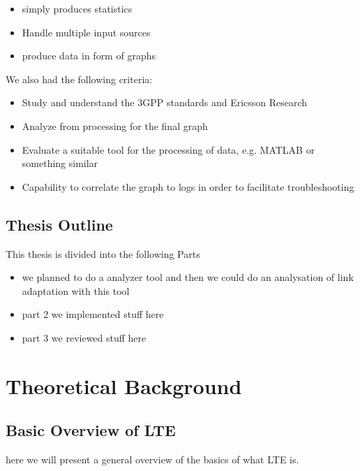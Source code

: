 \documentclass[cropmarks, frame, english]{idamasterthesis}
\begin{document}
 \begin{itemize} 
 \item simply produces statistics
 \item Handle multiple input sources
 \item produce data in form of graphs
 \end{itemize} 

\setlength{\parindent}{0cm} We also had the following criteria: 
 
 \begin{itemize} 
 \item Study and understand the 3GPP standards and Ericsson Research
 \item Analyze from processing for the final graph
 \item Evaluate a suitable tool for the processing of data, e.g. MATLAB or something similar
 \item Capability to correlate the graph to logs in order to facilitate troubleshooting
 \end{itemize}


 


\section{Thesis Outline}
This thesis is divided into the following Parts
\begin{itemize}
	\item we planned to do a analyzer tool and then we could do an analysation of link adaptation with this tool
	\item part 2 we implemented stuff here
	\item part 3 we reviewed stuff here
\end{itemize}

\chapter{Theoretical Background}
\section{Basic Overview of LTE}
here we will present a general overview of the basics of what LTE is.
\end{document}
